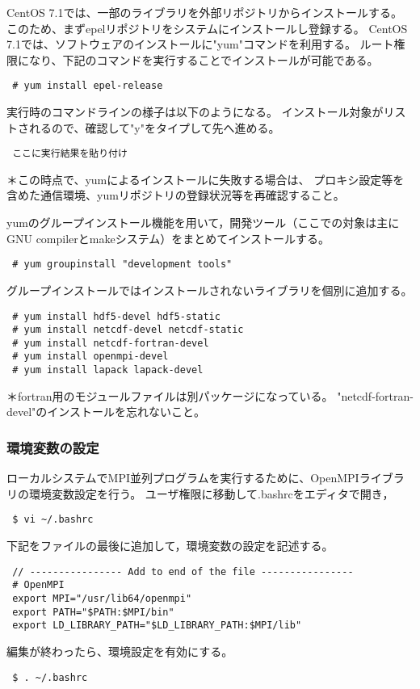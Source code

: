 CentOS 7.1では、一部のライブラリを外部リポジトリからインストールする。
このため、まずepelリポジトリをシステムにインストールし登録する。
CentOS 7.1では、ソフトウェアのインストールに"yum"コマンドを利用する。
ルート権限になり、下記のコマンドを実行することでインストールが可能である。
\begin{verbatim}
 # yum install epel-release
\end{verbatim}
実行時のコマンドラインの様子は以下のようになる。
インストール対象がリストされるので、確認して"y"をタイプして先へ進める。
\begin{verbatim}
 ここに実行結果を貼り付け
\end{verbatim}
{\small ＊この時点で、yumによるインストールに失敗する場合は、
プロキシ設定等を含めた通信環境、yumリポジトリの登録状況等を再確認すること。}

\noindent yumのグループインストール機能を用いて，開発ツール（ここでの対象は主にGNU compilerとmakeシステム）をまとめてインストールする。
\begin{verbatim}
 # yum groupinstall "development tools"
\end{verbatim}

\noindent グループインストールではインストールされないライブラリを個別に追加する。
\begin{verbatim}
 # yum install hdf5-devel hdf5-static
 # yum install netcdf-devel netcdf-static
 # yum install netcdf-fortran-devel
 # yum install openmpi-devel
 # yum install lapack lapack-devel
\end{verbatim}
{\small ＊fortran用のモジュールファイルは別パッケージになっている。
"netcdf-fortran-devel"のインストールを忘れないこと。}



\subsubsection{環境変数の設定}

ローカルシステムでMPI並列プログラムを実行するために、OpenMPIライブラリの環境変数設定を行う。
ユーザ権限に移動して.bashrcをエディタで開き，
\begin{verbatim}
 $ vi ~/.bashrc
\end{verbatim}
下記をファイルの最後に追加して，環境変数の設定を記述する。
\begin{verbatim}
 // ---------------- Add to end of the file ----------------
 # OpenMPI
 export MPI="/usr/lib64/openmpi"
 export PATH="$PATH:$MPI/bin"
 export LD_LIBRARY_PATH="$LD_LIBRARY_PATH:$MPI/lib"
\end{verbatim}
編集が終わったら、環境設定を有効にする。
\begin{verbatim}
 $ . ~/.bashrc
\end{verbatim}


